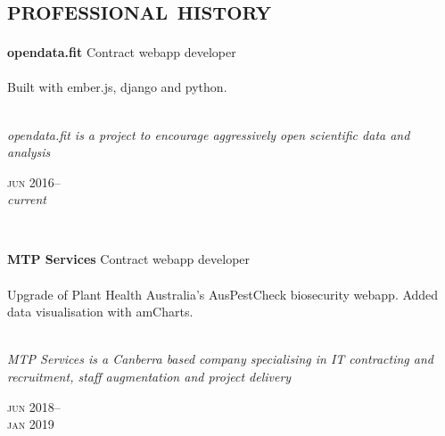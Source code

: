 
\vspace{-0.6cm}
\section*{\textsc{professional history}}
\vspace{-0.2cm}


\begin{minipage}[t]{0.70\textwidth}
\textbf{opendata.fit}\phantom{..} Contract webapp developer\\
\\
Built with ember.js, django and python.\\
\\
{\small
\textit{opendata.fit is a project to encourage aggressively open scientific data and
analysis} 
\par}
\end{minipage}
\begin{minipage}[t]{0.30\textwidth}
{
\hfill \textsc{jun} 2016--\\ 
\hspace*{0pt} \hfill \textit{current}
\par
}
\end{minipage}
\\

\begin{minipage}[t]{0.70\textwidth}
\textbf{MTP Services}\phantom{..} Contract webapp developer\\
\\
Upgrade of Plant Health Australia's AusPestCheck biosecurity webapp. Added 
data visualisation with amCharts.
\\
\\
{\small
\textit{MTP Services is a Canberra based company specialising in IT contracting and recruitment, staff augmentation and project delivery} 
\par}
\end{minipage}
\begin{minipage}[t]{0.30\textwidth}
{
\hfill \textsc{jun} 2018--\\ 
\hspace*{0pt} \hfill \textsc{jan} 2019
\par
}
\end{minipage}
\\

